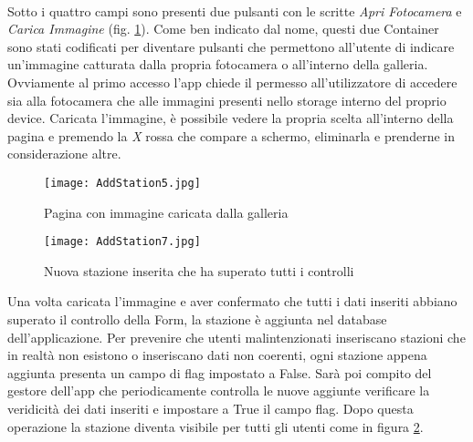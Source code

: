 \\
Sotto i quattro campi sono presenti due pulsanti con le scritte \textit{Apri
Fotocamera} e \textit{Carica Immagine} (fig. \ref{addStation5}). Come ben indicato dal nome, questi due
Container sono stati codificati per diventare pulsanti che permettono
all'utente di indicare un'immagine catturata dalla propria fotocamera o
all'interno 
della galleria. Ovviamente al primo accesso l'app chiede il permesso
all'utilizzatore di accedere sia alla fotocamera che alle immagini presenti nello storage
interno del proprio device. Caricata l'immagine, è possibile vedere la propria
scelta all'interno della pagina e premendo la \textit{X} rossa che compare a schermo,
eliminarla e prenderne in considerazione altre.
\begin{figure}
    \centering
    \texttt{[image: AddStation5.jpg]}
    \caption{Pagina con immagine caricata dalla galleria}
    \label{addStation5}
\end{figure}
\begin{figure}[!h]
    \centering
    \texttt{[image: AddStation7.jpg]}
    \caption{Nuova stazione inserita che ha superato tutti i controlli}
    \label{addStation7}
\end{figure}
Una volta caricata l'immagine e aver confermato che tutti i dati inseriti
abbiano superato il controllo della Form, la stazione è aggiunta nel database
dell'applicazione. Per prevenire che utenti malintenzionati inseriscano stazioni
che in realtà non esistono o inseriscano dati non coerenti, ogni stazione appena
aggiunta presenta un campo di flag impostato a False. Sarà poi compito del gestore
dell'app che periodicamente controlla le nuove aggiunte verificare la
veridicità dei dati inseriti e impostare a True il campo flag. Dopo questa
operazione la stazione diventa visibile per tutti gli utenti come in figura
\ref{addStation7}.

